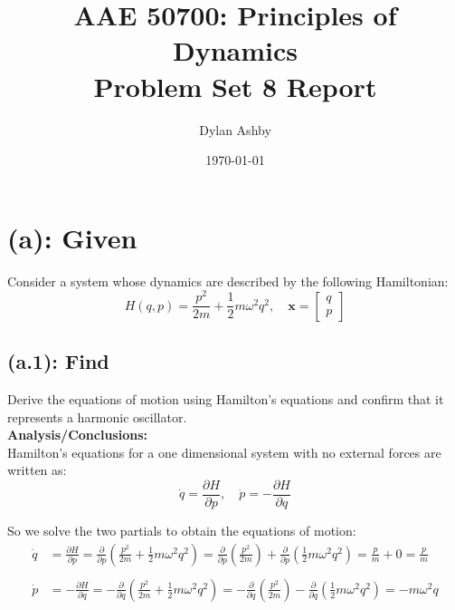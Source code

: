 \documentclass[titlepage]{article}
\title{AAE 50700: Principles of Dynamics\\ Problem Set 8 Report}
\author{Dylan Ashby}
\date{\today}
\begin{document}
\maketitle

\section*{(a): Given}

Consider a system whose dynamics are described by the following Hamiltonian:
\begin{equation}
	H(q,p)=\frac{p^2}{2m}+\frac{1}{2}m\omega^2q^2,\quad\boldsymbol{x}=
	\begin{bmatrix}
		q \\
		p
	\end{bmatrix}
\end{equation}

\subsection*{(a.1): Find}

Derive the equations of motion using Hamilton's equations and confirm that it represents a harmonic oscillator.\\

\textbf{Analysis/Conclusions:}\\

Hamilton's equations for a one dimensional system with no external forces are written as:
\begin{equation}
	\dot{q}=\frac{\partial H}{\partial p},\quad \dot{p}=-\frac{\partial H}{\partial q}
\end{equation}

So we solve the two partials to obtain the equations of motion:
\begin{equation}
	\begin{split}
		\dot{q}&=\frac{\partial H}{\partial p}=\frac{\partial}{\partial p}\left(\frac{p^2}{2m}+\frac{1}{2}m\omega^2q^2\right)=\frac{\partial}{\partial p}\left(\frac{p^2}{2m}\right)+\frac{\partial}{\partial p}\left(\frac{1}{2}m\omega^2q^2\right)=\frac{p}{m}+0=\frac{p}{m} \\
		\\
		\dot{p}&=-\frac{\partial H}{\partial q}=-\frac{\partial}{\partial q}\left(\frac{p^2}{2m}+\frac{1}{2}m\omega^2q^2\right)=-\frac{\partial}{\partial q}\left(\frac{p^2}{2m}\right)-\frac{\partial}{\partial q}\left(\frac{1}{2}m\omega^2q^2\right)=-m\omega^2q
	\end{split}
\end{equation}
\end{document}
